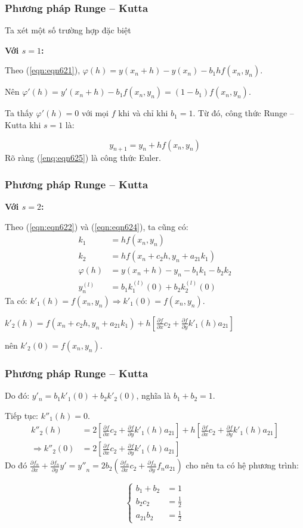 \begin{frame}
	\frametitle{Phương pháp Runge – Kutta}
	Ta xét một số trường hợp đặc biệt\par
	\textbf{Với $s=1$:}\par
	Theo (\ref{eqn:eqn621}), $\varphi(h)=y(x_n+h)-y(x_n)-b_1hf(x_n,y_n)$.\par
	Nên $\varphi' (h)= y'(x_n+h)-b_1f(x_n,y_n)=(1-b_1)f(x_n,y_n)$.\par
	Ta thấy $\varphi'(h)=0 $ với mọi $f$ khi và chỉ khi $b_1=1$. Từ đó, công thức Runge – Kutta khi $s=1$ là:\par
	\begin{equation}\label{enq:eqn625}
		y_{n+1} = y_n + hf(x_n,y_n)
	\end{equation}
	Rõ ràng (\ref{enq:eqn625}) là công thức Euler.
\end{frame}

\begin{frame}
	\frametitle{Phương pháp Runge – Kutta}
	\textbf{Với $s=2$:}\par
	Theo (\ref{eqn:eqn622}) và (\ref{eqn:eqn624}), ta cũng có:
	\begin{align*}
		k_1 &= hf(x_n,y_n)\\
		k_2 &= hf(x_n+c_2 h,y_n+a_{21} k_1)\\
		\varphi(h) &= y(x_n+h)-y_n-b_1 k_1-b_2 k_2\\
		y_n^{(l)} &= b_1 k_1^{(l)}(0)+b_2 k_2^{(l)}(0)
	\end{align*}
	Ta có: $k'_1(h)= f(x_n,y_n)\Rightarrow k'_1 (0)=f(x_n,y_n)$.\par
	$k'_2(h)=f(x_n+c_2 h,y_n+a_{21} k_1)+h\left[\frac{\partial f}{\partial x}c_2+\frac{\partial f}{\partial y}k'_1(h)a_{21}\right]$\par
	nên $k'_2(0)=f(x_n,y_n)$.\par
\end{frame}

\begin{frame}
	\frametitle{Phương pháp Runge – Kutta}
	Do đó: $y'_n=b_1 k'_1(0)+b_2k'_2(0)$, nghĩa là $b_1+b_2=1$.\par
	Tiếp tục: $k''_1(h)=0.$
	\begin{align*}
		{k''}_2(h)&=2\left[\frac{\partial f}{\partial x}c_2+\frac{\partial f}{\partial y}{k'}_1(h)a_{21}\right]+h\left[\frac{\partial f}{\partial x}c_2+\frac{\partial f}{\partial y}{k'}_1(h)a_{21} \right]\\
		\Rightarrow {k''}_2(0)&=2\left[\frac{\partial f}{\partial x}c_2 +\frac{\partial f}{\partial y}{k'}_1(h)a_{21}\right]
	\end{align*}
	Do đó $\frac{\partial f_n}{\partial x}+\frac{\partial f_n}{\partial y}y'={y''}_n=2b_2\left(\frac{\partial f_n}{\partial x}c_2+\frac{\partial f_n}{\partial y}f_n a_{21}\right)$ cho nên ta có hệ phương trình:\par
	$$\begin{cases}
		b_1+b_2&=1\\
		b_2 c_2&=\frac12\\
		a_{21}b_2&=\frac12
	\end{cases}$$
\end{frame}

